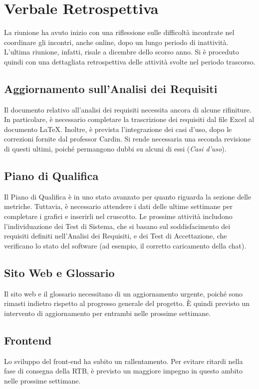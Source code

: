 \documentclass{article}
\begin{document}
\section{Verbale Retrospettiva}
La riunione ha avuto inizio con una riflessione sulle difficoltà incontrate nel coordinare gli incontri, anche online, dopo un lungo periodo di inattività. L'ultima riunione, infatti, risale a dicembre dello scorso anno. Si è proceduto quindi con una dettagliata retrospettiva delle attività svolte nel periodo trascorso.

\subsection{Aggiornamento sull'Analisi dei Requisiti}
Il documento relativo all'analisi dei requisiti necessita ancora di alcune rifiniture. In particolare, è necessario completare la trascrizione dei requisiti dal file Excel al documento LaTeX. Inoltre, è prevista l'integrazione dei casi d'uso, dopo le correzioni fornite dal professor Cardin. Si rende necessaria una seconda revisione di questi ultimi, poiché permangono dubbi su alcuni di essi (\textit{Casi d'uso}).

\subsection{Piano di Qualifica}
Il Piano di Qualifica è in uno stato avanzato per quanto riguarda la sezione delle metriche. Tuttavia, è necessario attendere i dati delle ultime settimane per completare i grafici e inserirli nel cruscotto. Le prossime attività includono l'individuazione dei Test di Sistema, che si basano sul soddisfacimento dei requisiti definiti nell'Analisi dei Requisiti, e dei Test di Accettazione, che verificano lo stato del software (ad esempio, il corretto caricamento della chat).

\subsection{Sito Web e Glossario}
Il sito web e il glossario necessitano di un aggiornamento urgente, poiché sono rimasti indietro rispetto al progresso generale del progetto. È quindi previsto un intervento di aggiornamento per entrambi nelle prossime settimane.

\subsection{Frontend}
Lo sviluppo del front-end ha subito un rallentamento. Per evitare ritardi nella fase di consegna della RTB, è previsto un maggiore impegno in questo ambito nelle prossime settimane.
\end{document}
